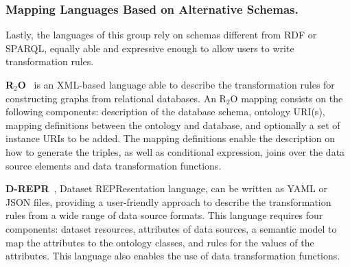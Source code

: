 



\subsubsection{Mapping Languages Based on Alternative Schemas.} 
\label{sec:chp2_alternative-languages}

Lastly, the languages of this group rely on schemas different from RDF or SPARQL, equally able and expressive enough to allow users to write transformation rules. 


\noindent\textbf{R$_2$O}~\parencite{barrasa2004r2o} is an XML-based language able to describe the transformation rules for constructing graphs from relational databases. %
An R$_2$O mapping consists on the following components: description of the database schema, ontology URI(s), mapping definitions between the ontology and database, and optionally a set of instance URIs to be added. The mapping definitions enable the description on how to generate the triples, as well as conditional expression, joins over the data source elements and data transformation functions. 


\noindent\textbf{D-REPR}~\parencite{Vu2019d-repr}, Dataset REPResentation language, can be written as YAML or JSON files, providing a user-friendly approach to describe the transformation rules from a wide range of data source formats. This language requires four components: dataset resources, attributes of data sources, a semantic model to map the attributes to the ontology classes, and rules for the values of the attributes. This language also enables the use of data transformation functions. 

